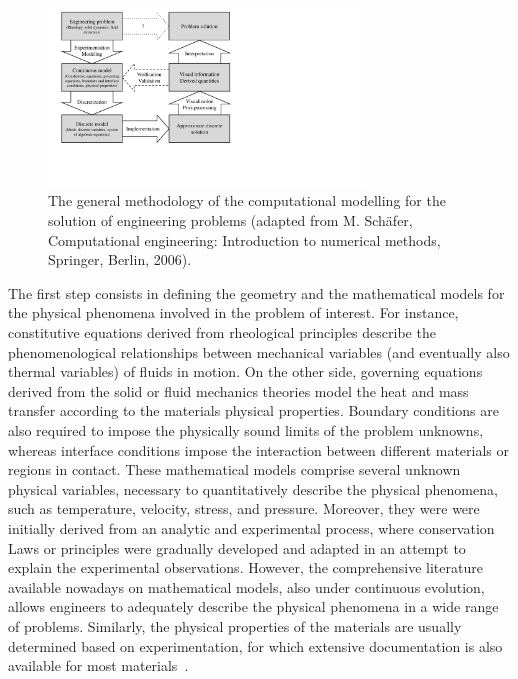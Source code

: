 \begin{figure}[!htb]
\centering
\includegraphics[width=0.75\textwidth]{chap1/include/figures/computational_modelling_methodology.pdf}
\caption[The general methodology of the computational modelling for the solution of engineering problems.]{The general methodology of the computational modelling for the solution of engineering problems (adapted from M. Sch\"afer, Computational engineering: Introduction to numerical methods, Springer, Berlin, 2006).}
\label{chap1:fig:computational_modelling_computational_modelling_methodology}
\end{figure}

The first step consists in defining the geometry and the mathematical models for the physical phenomena involved in the problem of interest.
For instance, constitutive equations derived from rheological principles describe the phenomenological relationships between mechanical variables (and eventually also thermal variables) of fluids in motion.
On the other side, governing equations derived from the solid or fluid mechanics theories model the heat and mass transfer according to the materials physical properties.
Boundary conditions are also required to impose the physically sound limits of the problem unknowns, whereas interface conditions impose the interaction between different materials or regions in contact.
These mathematical models comprise several unknown physical variables, necessary to quantitatively describe the physical phenomena, such as temperature, velocity, stress, and pressure.
Moreover, they were were initially derived from an analytic and experimental process, where conservation Laws or principles were gradually developed and adapted in an attempt to explain the experimental observations.
However, the comprehensive literature available nowadays on mathematical models, also under continuous evolution, allows engineers to adequately describe the physical phenomena in a wide range of problems.
Similarly, the physical properties of the materials are usually determined based on experimentation, for which extensive documentation is also available for most materials~\cite{chap1:2001morrison,chap1:2014beer}.

